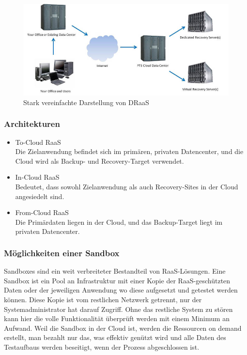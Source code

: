 \documentclass[letterpaper, 12pt]{article}
\let\tempsubsubsection\subsubsection
\renewcommand\subsubsection[1]{\vspace{0cm}\tempsubsubsection{#1}\vspace{0cm}}
\begin{document}
\begin{figure}[h]
	\begin{center}
		\includegraphics[width=1\linewidth]{images/disaster-recovery-as-a-service}
		\caption{Stark vereinfachte Darstellung von DRaaS \cite{bild4}}
		\label{DRaaS}
	\end{center}
\end{figure}

\subsubsection{Architekturen}

\begin{itemize}
	\item To-Cloud RaaS \\
	Die Zielanwendung befindet sich im primären, privaten Datencenter, und die Cloud wird als Backup- und Recovery-Target verwendet.
	\item In-Cloud RaaS \\
	Bedeutet, dass sowohl Zielanwendung als auch Recovery-Sites in der Cloud angesiedelt sind.
	\item From-Cloud RaaS \\
	Die Primärdaten liegen in der Cloud, und das Backup-Target liegt im privaten Datencenter.
\end{itemize}

\subsubsection{Möglichkeiten einer Sandbox}

Sandboxes sind ein weit verbreiteter Bestandteil von RaaS-Lösungen. Eine Sandbox ist ein Pool an Infrastruktur mit einer Kopie der RaaS-geschützten Daten oder der jeweiligen Anwendung wo diese aufgesetzt und getestet werden können. Diese Kopie ist vom restlichen Netzwerk getrennt, nur der Systemadministrator hat darauf Zugriff. Ohne das restliche System zu stören kann hier die volle Funktionalität überprüft werden mit einem Minimum an Aufwand. Weil die Sandbox in der Cloud ist, werden die Ressourcen on demand erstellt, man bezahlt nur das, was effektiv genützt wird und alle Daten des Testaufbaus werden beseitigt, wenn der Prozess abgeschlossen ist.
\end{document}

